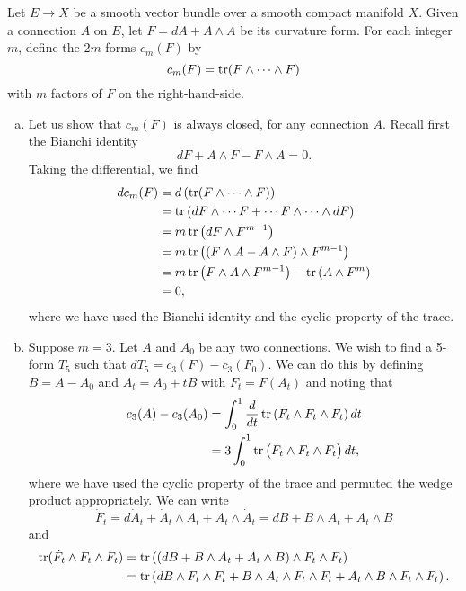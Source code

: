 \documentclass{../mathnotes}
\begin{document}
Let $E\to X$ be a smooth vector bundle over a smooth compact manifold $X$. Given a connection $A$ on $E$,
let $F=dA+A\wedge A$ be its curvature form. For each integer $m$, define the $2m$-forms $c_m(F)$ by
\[c_m(F)=\operatorname{tr}(F\wedge\cdots\wedge F)\]
with $m$ factors of $F$ on the right-hand-side.

\begin{enumerate}[(a)]
    \item Let us show that $c_m(F)$ is always closed, for any connection $A$. Recall first the Bianchi identity
        \[dF+A\wedge F-F\wedge A = 0.\]
        Taking the differential, we find
        \begin{align*}
            dc_m(F) &= d\left( \operatorname{tr}(F\wedge\cdots\wedge F) \right)\\
            &=\operatorname{tr}\left( dF\wedge \cdots F + \cdots F\wedge \cdots\wedge dF \right)\\
            &=m\operatorname{tr}\left( dF\wedge F^{m-1} \right)\\
            &=m\operatorname{tr}\left( (F\wedge A-A\wedge F)\wedge F^{m-1} \right)\\
            &=m\operatorname{tr}\left( F\wedge A\wedge F^{m-1} \right)-\operatorname{tr}\left( A\wedge F^m \right)\\
            &=0,
        \end{align*}
        where we have used the Bianchi identity and the cyclic property of the trace.
    \item Suppose $m=3$. Let $A$ and $A_0$ be any two connections. We wish to find a 5-form $T_5$ such that
        $dT_5=c_3(F)-c_3(F_0)$. We can do this by defining $B=A-A_0$ and $A_t=A_0+tB$ with $F_t=F(A_t)$
        and noting that
        \begin{align*}
            c_3(A)-c_3(A_0) &= \int_0^1\frac{d}{dt}\operatorname{tr}\left( F_t\wedge F_t\wedge F_t \right)dt\\
            &=3\int_0^1\operatorname{tr}\left( \dot F_t\wedge F_t\wedge F_t \right) dt,
        \end{align*}
        where we have used the cyclic property of the trace and permuted the wedge product appropriately.
        We can write
        \[\dot F_t=d\dot A_t+\dot A_t\wedge A_t+A_t\wedge\dot A_t=dB+B\wedge A_t+A_t\wedge B\]
        and
        \begin{align*}
            \tr(\dot F_t\wedge F_t\wedge F_t) &= \tr\left( (dB+B\wedge A_t+A_t\wedge B)\wedge F_t\wedge F_t \right)\\
            &= \tr\left( dB\wedge F_t\wedge F_t+B\wedge A_t\wedge F_t\wedge F_t+A_t\wedge B\wedge F_t\wedge F_t \right).

\end{align*}
\end{enumerate}
\end{document}
